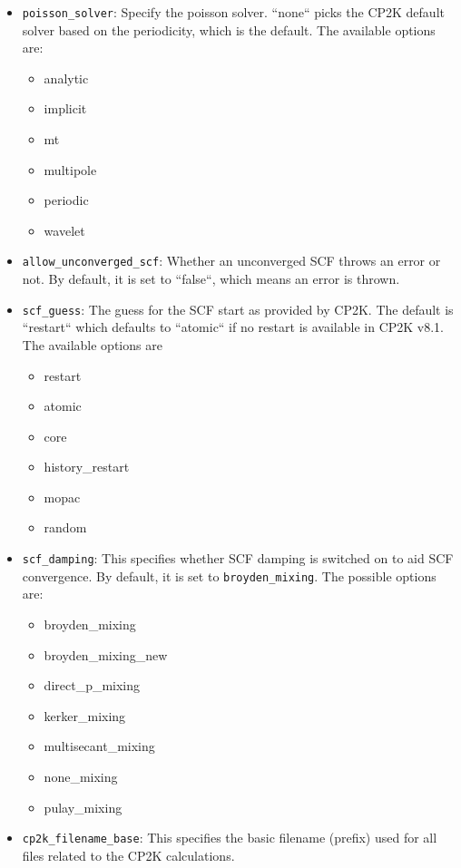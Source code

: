 \documentclass[]{tufte-book}
\begin{document}
\begin{itemize}
	\item \texttt{poisson\_solver}: Specify the poisson solver. ``none`` picks the \textsc{CP2K} default solver based on the periodicity, which is the default. The available options are:
        \begin{itemize}
		\item analytic
		\item implicit
		\item mt
		\item multipole
		\item periodic
		\item wavelet
        \end{itemize}
	\item \texttt{allow\_unconverged\_scf}: Whether an unconverged SCF throws an error or not. By default, it is set to ``false``, which means an error is thrown.
	\item \texttt{scf\_guess}: The guess for the SCF start as provided by \textsc{CP2K}. The default is ``restart`` which defaults to ``atomic`` if no restart is available in \textsc{CP2K} v8.1. The available options are
        \begin{itemize}
		\item restart
		\item atomic
		\item core
		\item history\_restart
		\item mopac
		\item random
        \end{itemize}
	\item \texttt{scf\_damping}: This specifies whether SCF damping is switched on to aid SCF convergence. By default, it is set to \texttt{broyden\_mixing}. The possible options are:
        \begin{itemize}
 		\item broyden\_mixing
                \item broyden\_mixing\_new
                \item direct\_p\_mixing
                \item kerker\_mixing
                \item multisecant\_mixing
                \item none\_mixing
                \item pulay\_mixing
        \end{itemize}
	\item \texttt{cp2k\_filename\_base}: This specifies the basic filename (prefix) used for all files related to the \textsc{CP2K} calculations.

\end{itemize}
\end{document}
